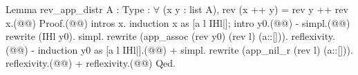Lemma rev_app_distr {A : Type} : $\forall$ (x y : list A), rev (x ++ y) = rev y ++ rev x.(@\vspace{-0.04cm}@)
Proof.(@\vspace{-0.04cm}@)
  intros x. induction x as [a l IHl|]; intro y0.(@\vspace{-0.04cm}@)
  - simpl.(@\vspace{-0.04cm}@)
    rewrite (IHl y0). simpl. rewrite (app_assoc (rev y0) (rev l) (a::[])). reflexivity.(@\vspace{-0.04cm}@)
  - induction y0 as [a l IHl|].(@\vspace{-0.04cm}@)
    + simpl. rewrite (app_nil_r (rev l) (a::[])). reflexivity.(@\vspace{-0.04cm}@)
    + reflexivity.(@\vspace{-0.04cm}@)
Qed.
